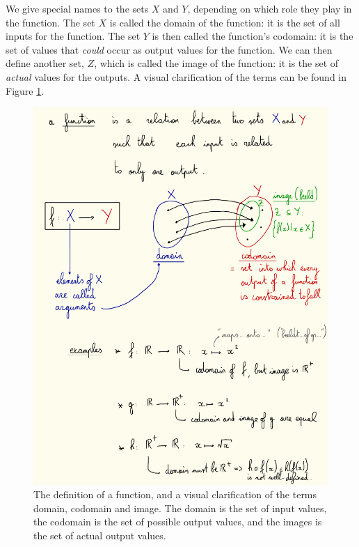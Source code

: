     We give special names to the sets $X$ and $Y$, depending on which role they play in the function. The set $X$ is called the domain of the function: it is the set of all inputs for the function. The set $Y$ is then called the function's codomain: it is the set of values that \emph{could} occur as output values for the function. We can then define another set, $Z$, which is called the image of the function: it is the set of \emph{actual} values for the outputs. A visual clarification of the terms can be found in Figure \ref{fig:functions}. \\
    \begin{figure}[H] \centering
        \includegraphics{images/functions}
        \caption{The definition of a function, and a visual clarification of the terms domain, codomain and image. The domain is the set of input values, the codomain is the set of possible output values, and the images is the set of actual output values.}
        \label{fig:functions}
    \end{figure}

